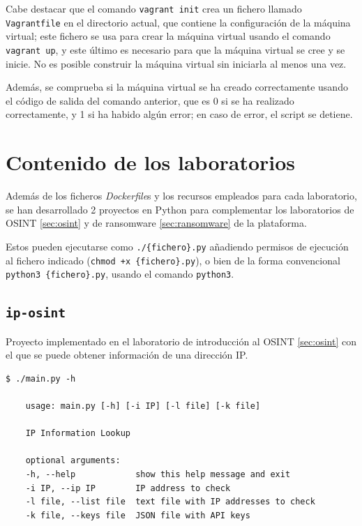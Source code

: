                 Cabe destacar que el comando \texttt{vagrant init} crea un fichero llamado \texttt{Vagrantfile} en el directorio actual, que contiene la configuración de la máquina virtual; este fichero se usa para crear la máquina virtual usando el comando \texttt{vagrant up}, y este último es necesario para que la máquina virtual se cree y se inicie. No es posible construir la máquina virtual sin iniciarla al menos una vez.

                Además, se comprueba si la máquina virtual se ha creado correctamente usando el código de salida del comando anterior, que es 0 si se ha realizado correctamente, y 1 si ha habido algún error; en caso de error, el script se detiene.

                \newpage


    \section{Contenido de los laboratorios}

        Además de los ficheros \textit{Dockerfile}s y los recursos empleados para cada laboratorio, se han desarrollado 2 proyectos en Python para complementar los laboratorios de OSINT \ref{sec:osint} y de ransomware \ref{sec:ransomware} de la plataforma.

        Estos pueden ejecutarse como \texttt{./\{fichero\}.py} añadiendo permisos de ejecución al fichero indicado (\texttt{chmod +x \{fichero\}.py}), o bien de la forma convencional \texttt{python3 \{fichero\}.py}, usando el comando \texttt{python3}.

        \subsection{\texttt{ip-osint}}

            Proyecto implementado en el laboratorio de introducción al OSINT \ref{sec:osint} con el que se puede obtener información de una dirección IP.
            \\

            \begin{lstlisting}[style=bash_style, caption={Menú de ayuda del proyecto}]
    $ ./main.py -h
    
    usage: main.py [-h] [-i IP] [-l file] [-k file]

    IP Information Lookup

    optional arguments:
    -h, --help            show this help message and exit
    -i IP, --ip IP        IP address to check
    -l file, --list file  text file with IP addresses to check
    -k file, --keys file  JSON file with API keys
            \end{lstlisting}


